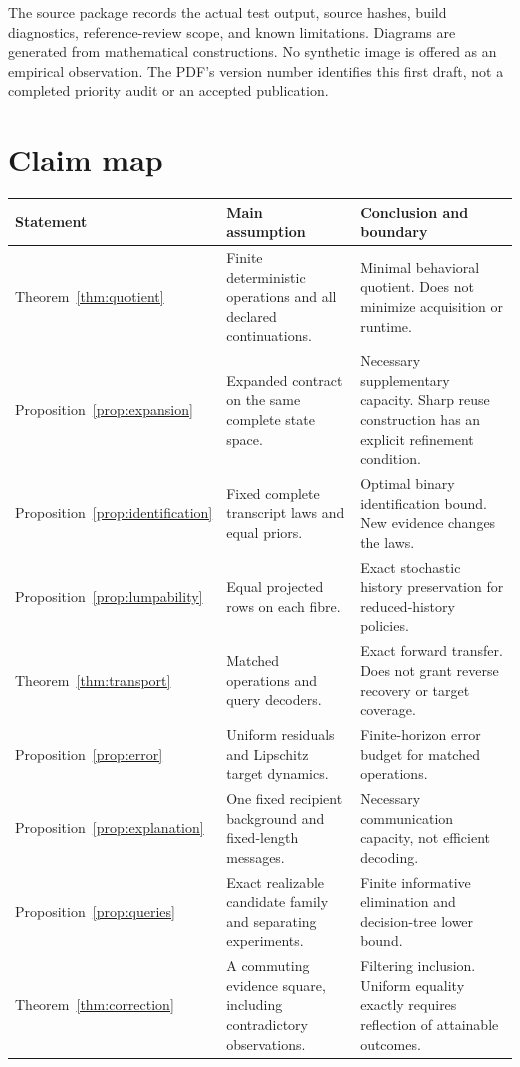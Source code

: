 \documentclass[11pt,letterpaper]{article}
\theoremstyle{plain}
\theoremstyle{definition}
\begin{document}
The source package records the actual test output, source hashes, build diagnostics, reference-review scope, and known limitations. Diagrams are generated from mathematical constructions. No synthetic image is offered as an empirical observation. The PDF's version number identifies this first draft, not a completed priority audit or an accepted publication.

\section{Claim map}\label{app:claims}
\begin{center}\small
\begin{tabularx}{\textwidth}{@{}P{1.1in}P{1.55in}X@{}}\toprule
Statement & Main assumption & Conclusion and boundary\\\midrule
Theorem~\ref{thm:quotient} & Finite deterministic operations and all declared continuations. & Minimal behavioral quotient. Does not minimize acquisition or runtime.\\
Proposition~\ref{prop:expansion} & Expanded contract on the same complete state space. & Necessary supplementary capacity. Sharp reuse construction has an explicit refinement condition.\\
Proposition~\ref{prop:identification} & Fixed complete transcript laws and equal priors. & Optimal binary identification bound. New evidence changes the laws.\\
Proposition~\ref{prop:lumpability} & Equal projected rows on each fibre. & Exact stochastic history preservation for reduced-history policies.\\
Theorem~\ref{thm:transport} & Matched operations and query decoders. & Exact forward transfer. Does not grant reverse recovery or target coverage.\\
Proposition~\ref{prop:error} & Uniform residuals and Lipschitz target dynamics. & Finite-horizon error budget for matched operations.\\
Proposition~\ref{prop:explanation} & One fixed recipient background and fixed-length messages. & Necessary communication capacity, not efficient decoding.\\
Proposition~\ref{prop:queries} & Exact realizable candidate family and separating experiments. & Finite informative elimination and decision-tree lower bound.\\
Theorem~\ref{thm:correction} & A commuting evidence square, including contradictory observations. & Filtering inclusion. Uniform equality exactly requires reflection of attainable outcomes.\\\bottomrule
\end{tabularx}\end{center}
\end{document}
